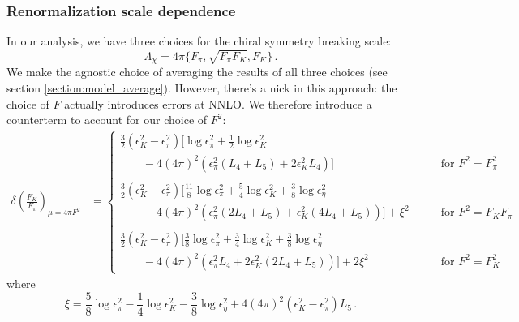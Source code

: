 \documentclass[prd,tightenlines,preprintnumbers,showpacs,superscriptaddress,notitlepage,eqsecnum,floatfix,notitlepage]{revtex4-1}
\begin{document}
\subsubsection{Renormalization scale dependence}
In our analysis, we have three choices for the chiral symmetry breaking scale:
\begin{equation}
\Lambda_\chi  = 4 \pi \{ F_\pi, \sqrt{F_\pi F_K}, F_K\} \, .
\end{equation}
We make the agnostic choice of averaging the results of all three choices (see section \ref{section:model_average}). However, there's a nick in this approach: the choice of $F$ actually introduces errors at NNLO. We therefore introduce a counterterm to account for our choice of $F^2$:
\begin{align}
\delta\left(\frac{F_K}{F_\pi}\right)_{\mu = 4\pi F^2} &=
\begin{cases}
\frac 32 \left( \epsilon^2_K - \epsilon_\pi^2 \right) \big[
\log \epsilon_\pi^2 + \frac 12 \log \epsilon^2_K \\
\qquad - 4 (4\pi)^2 \left( \epsilon_\pi^2 (L_4 + L_5 ) + 2\epsilon_K^2 L_4 \right)
\big] 
&\qquad \text{for $F^2= F_\pi^2$} \\ \\
\frac 32 \left( \epsilon^2_K - \epsilon_\pi^2 \right) \big[
\frac{11}{8} \log \epsilon_\pi^2 + \frac 54 \log \epsilon^2_K + \frac 38 \log \epsilon_\eta^2 \\
\qquad - 4 (4\pi)^2 \left( \epsilon_\pi^2 (2 L_4 + L_5) + \epsilon_K^2 (4 L_4 + L_5) \right)
\big] + \xi^2
&\qquad \text{for $F^2= F_K F_\pi $} \\ \\
\frac 32 \left( \epsilon^2_K - \epsilon_\pi^2 \right) \big[
\frac{3}{8} \log \epsilon_\pi^2 + \frac 34 \log \epsilon^2_K + \frac 38 \log \epsilon_\eta^2 \\
\qquad - 4 (4\pi)^2 \left( \epsilon_\pi^2 L_4 + 2\epsilon_K^2  (2 L_4 + L_5) \right)
\big] + 2 \xi^2
&\qquad \text{for $F^2= F_K^2$}
\end{cases}
\end{align}
where
\begin{equation}
\xi = \frac 58 \log \epsilon_\pi^2 - \frac 14 \log \epsilon_K^2 - \frac 38 \log \epsilon_\eta^2 
+ 4 (4 \pi)^2 \left(\epsilon_K^2 - \epsilon_\pi^2\right) L_5 \, .
\end{equation}
\end{document}
